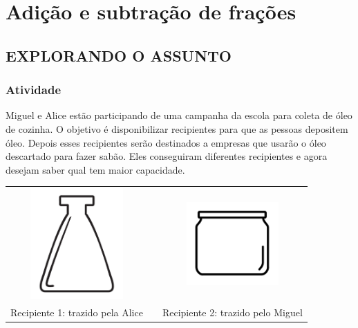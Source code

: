 
\setcounter{chapter}{4}
\chapter{Adição e subtração de frações }

\section{EXPLORANDO O ASSUNTO }

\setcounter{subsection}{0}
\subsection{Atividade}


Miguel e Alice estão participando de uma campanha da escola para coleta de óleo de cozinha. O objetivo é disponibilizar recipientes para que as pessoas depositem óleo. Depois esses recipientes serão destinados a empresas que usarão o óleo descartado para fazer sabão. Eles conseguiram diferentes recipientes e agora desejam saber qual tem maior capacidade.


\begin{tabular}{ccc}
\includegraphics[width=100pt, keepaspectratio]{..//media/cap5/secoes/PNGs_licao_05/ativ1_fig01.png} &\quad \quad&\includegraphics[width=100pt, keepaspectratio]{..//media/cap5/secoes/PNGs_licao_05/ativ1_fig02.png}\\
Recipiente 1: trazido pela Alice & &Recipiente 2: trazido pelo Miguel 
\end{tabular} 

